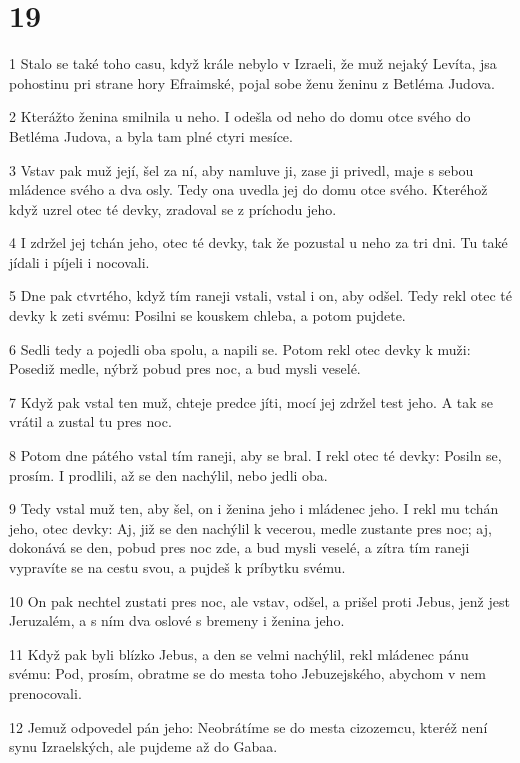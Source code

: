 \chapter{19}

\par 1 Stalo se také toho casu, když krále nebylo v Izraeli, že muž nejaký Levíta, jsa pohostinu pri strane hory Efraimské, pojal sobe ženu ženinu z Betléma Judova.
\par 2 Kterážto ženina smilnila u neho. I odešla od neho do domu otce svého do Betléma Judova, a byla tam plné ctyri mesíce.
\par 3 Vstav pak muž její, šel za ní, aby namluve ji, zase ji privedl, maje s sebou mládence svého a dva osly. Tedy ona uvedla jej do domu otce svého. Kteréhož když uzrel otec té devky, zradoval se z príchodu jeho.
\par 4 I zdržel jej tchán jeho, otec té devky, tak že pozustal u neho za tri dni. Tu také jídali i píjeli i nocovali.
\par 5 Dne pak ctvrtého, když tím raneji vstali, vstal i on, aby odšel. Tedy rekl otec té devky k zeti svému: Posilni se kouskem chleba, a potom pujdete.
\par 6 Sedli tedy a pojedli oba spolu, a napili se. Potom rekl otec devky k muži: Posediž medle, nýbrž pobud pres noc, a bud mysli veselé.
\par 7 Když pak vstal ten muž, chteje predce jíti, mocí jej zdržel test jeho. A tak se vrátil a zustal tu pres noc.
\par 8 Potom dne pátého vstal tím raneji, aby se bral. I rekl otec té devky: Posiln se, prosím. I prodlili, až se den nachýlil, nebo jedli oba.
\par 9 Tedy vstal muž ten, aby šel, on i ženina jeho i mládenec jeho. I rekl mu tchán jeho, otec devky: Aj, již se den nachýlil k vecerou, medle zustante pres noc; aj, dokonává se den, pobud pres noc zde, a bud mysli veselé, a zítra tím raneji vypravíte se na cestu svou, a pujdeš k príbytku svému.
\par 10 On pak nechtel zustati pres noc, ale vstav, odšel, a prišel proti Jebus, jenž jest Jeruzalém, a s ním dva oslové s bremeny i ženina jeho.
\par 11 Když pak byli blízko Jebus, a den se velmi nachýlil, rekl mládenec pánu svému: Pod, prosím, obratme se do mesta toho Jebuzejského, abychom v nem prenocovali.
\par 12 Jemuž odpovedel pán jeho: Neobrátíme se do mesta cizozemcu, kteréž není synu Izraelských, ale pujdeme až do Gabaa.
